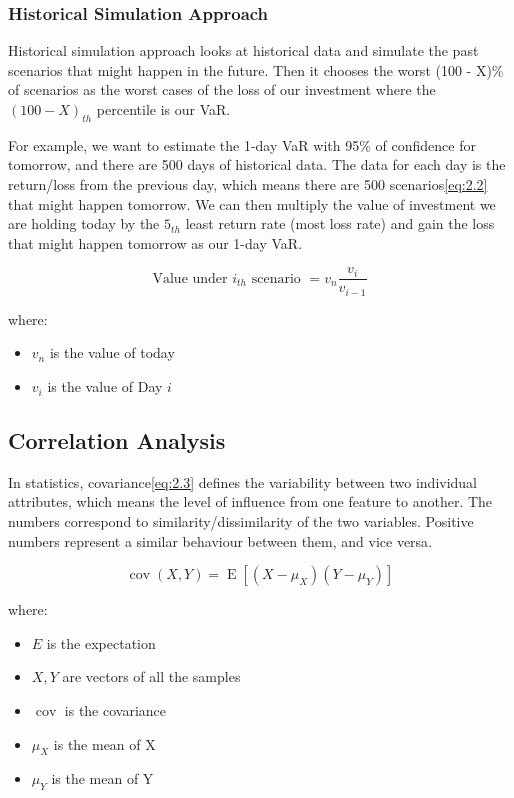 \documentclass[11pt]{article} %
\theoremstyle{plain}
\theoremstyle{definition}
\begin{document}
\subsubsection{Historical Simulation Approach}

Historical simulation approach looks at historical data and simulate the past  scenarios that might happen in the future. Then it chooses the worst (100 - X)\% of scenarios as the worst cases of the loss of our investment where the $(100 - X)_{th}$ percentile is our VaR.

For example, we want to estimate the 1-day VaR with 95\% of confidence for tomorrow, and there are 500 days of historical data. The data for each day is the return/loss from the previous day, which means there are 500 scenarios\eqref{eq:2.2} that might happen tomorrow. We can then multiply the value of investment we are holding today by the $5_{th}$ least return rate (most loss rate) and gain the loss that might happen tomorrow as our 1-day VaR\cite{john/ofaod:2017}.

{
  \begin{equation}
    \label{eq:2.2}
    \tag{2.2}
    {\text{Value under } i_{th} \text{ scenario } = v_{n}\frac{v_{i}}{v_{i-1}}}
  \end{equation}

  \footnotesize
  where:
  \begin{itemize}[label=-, leftmargin=4em, itemsep=0.1em]
    \item $v_{n}$ is the value of today
    \item $v_{i}$ is the value of Day $i$
  \end{itemize}
}

\subsection{Correlation Analysis}

In statistics, covariance\eqref{eq:2.3} defines the variability between two individual attributes, which means the level of influence from one feature to another. The numbers correspond to similarity/dissimilarity of the two variables. Positive numbers represent a similar behaviour between them, and vice versa\cite{wiki/cov:2018}.

{
  \begin{equation}
    \label{eq:2.3}
    \tag{2.3}
    {\operatorname {cov} (X,Y)=\operatorname {E} [(X-\mu _{X})(Y-\mu _{Y})]}
  \end{equation}

  \footnotesize
  where:
  \begin{itemize}[label=-, leftmargin=4em, itemsep=0.1em]
    \item ${E}$ is the expectation
    \item ${X, Y}$ are vectors of all the samples
    \item $\operatorname {cov}$ is the covariance
    \item ${\mu}_{X}$ is the mean of X
    \item ${\mu}_{Y}$ is the mean of Y
  \end{itemize}
}
\end{document}
